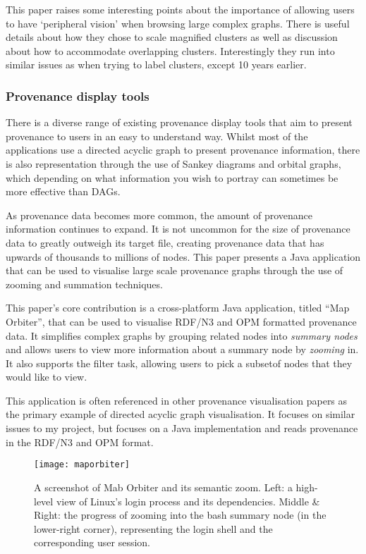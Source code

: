 This paper raises some interesting points about the importance of allowing users to have `peripheral vision' when browsing large complex graphs. There is useful details about how they chose to scale magnified clusters as well as discussion about how to accommodate overlapping clusters. Interestingly they run into similar issues as \cite{Abello2006} when trying to label clusters, except 10 years earlier.  

\subsubsection{Provenance display tools}

There is a diverse range of existing provenance display tools that aim to present provenance to users in an easy to understand way. Whilst most of the applications use a directed acyclic graph to present provenance information, there is also representation through the use of Sankey diagrams and orbital graphs, which depending on what information you wish to portray can sometimes be more effective than DAGs.

As provenance data becomes more common, the amount of provenance information continues to expand. It is not uncommon for the size of provenance data to greatly outweigh its target file, creating provenance data that has upwards of thousands to millions of nodes. This paper presents a Java application that can be used to visualise large scale provenance graphs through the use of zooming and summation techniques.

This paper's core contribution is a cross-platform Java application, titled ``Map Orbiter'', that can be used to visualise RDF/N3 and OPM formatted provenance data. It simplifies complex graphs by grouping related nodes into \textit{summary nodes} and allows users to view more information about a summary node by \textit{zooming} in. It also supports the filter task, allowing users to pick a subsetof nodes that they would like to view. 

This application is often referenced in other provenance visualisation papers as the primary example of directed acyclic graph visualisation. It focuses on similar issues to my project, but focuses on a Java implementation and reads provenance in the RDF/N3 and OPM format.

\begin{figure}[h]
	\centering
	\texttt{[image: maporbiter]}
	\caption{A screenshot of Mab Orbiter and its semantic zoom. Left: a high-level view of Linux’s login process and its dependencies. Middle \& Right: the progress of zooming into the bash summary node (in the lower-right corner), representing the login shell and the corresponding user session.}
	\label{fig:maporbiter}
\end{figure}

